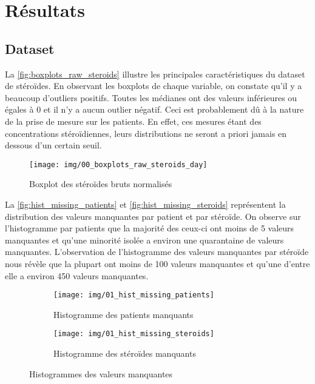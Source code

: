 \chapter{Résultats}

\section{Dataset}


    La \autoref{fig:boxplots_raw_steroids} illustre les principales caractéristiques du dataset de stéroïdes. En observant les boxplots de chaque variable, on constate qu'il y a beaucoup d'outliers positifs. Toutes les médianes ont des valeurs inférieures ou égales à 0 et il n'y a aucun outlier négatif. Ceci est probablement dû à la nature de la prise de mesure sur les patients. En effet, ces mesures étant des concentrations stéroïdiennes, leurs distributions ne seront a priori jamais en dessous d'un certain seuil.

    \begin{figure}[H]
        \centering
        \texttt{[image: img/00\_boxplots\_raw\_steroids\_day]}    
        \caption{Boxplot des stéroïdes bruts normalisés}
        \label{fig:boxplots_raw_steroids}
    \end{figure}

    La \autoref{fig:hist_missing_patients} et \autoref{fig:hist_missing_steroids} représentent la distribution des valeurs manquantes par patient et par stéroïde. On observe sur l'histogramme par patients que la majorité des ceux-ci ont moins de 5 valeurs manquantes et qu'une minorité isolée a environ une quarantaine de valeurs manquantes. L'observation de l'histogramme des valeurs manquantes par stéroïde nous révèle que la plupart ont moins de 100 valeurs manquantes et qu'une d'entre elle a environ 450 valeurs manquantes.

    \begin{figure}[H]
        \begin{subfigure}[b]{0.5\textwidth}
            \centering
                \texttt{[image: img/01\_hist\_missing\_patients]}
                \caption{Histogramme des patients manquants}
                \label{fig:hist_missing_patients}
        \end{subfigure}
        \begin{subfigure}[b]{0.5\textwidth}
            \centering
                \texttt{[image: img/01\_hist\_missing\_steroids]}
                \caption{Histogramme des stéroïdes manquants}
                \label{fig:hist_missing_steroids}
        \end{subfigure}
        \caption{Histogrammes des valeurs manquantes}
        \label{fig:hist_missing}
    \end{figure}

